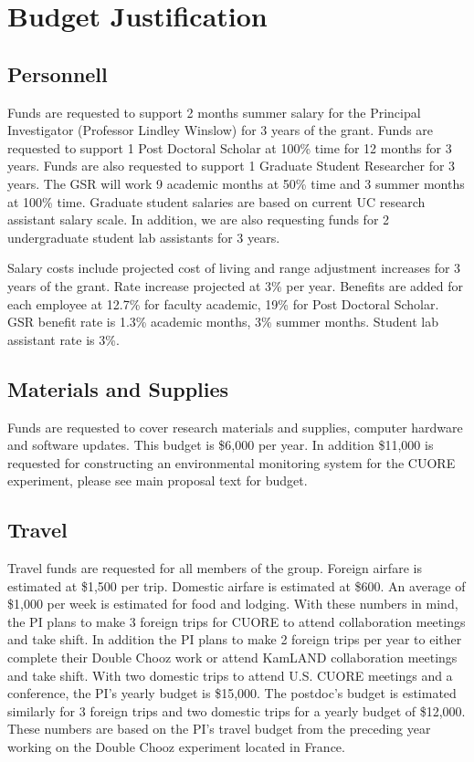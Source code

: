 \section{Budget Justification}

\subsection{Personnell}
Funds are requested to support 2 months summer salary for the Principal Investigator (Professor Lindley Winslow) for 3 years of the grant.  Funds are requested to support 1 Post Doctoral Scholar at 100\% time for 12 months for 3 years.  Funds are also requested to support 1 Graduate Student Researcher for 3 years. The GSR will work 9 academic months at 50\% time and 3 summer months at 100\% time.  Graduate student salaries are based on current UC research assistant salary scale. In addition, we are also requesting funds for 2 undergraduate student lab assistants for 3 years.

Salary costs include projected cost of living and range adjustment increases for 3 years of the grant.  Rate increase projected at 3\% per year. Benefits are added for each employee at 12.7\% for faculty academic, 19\% for Post Doctoral Scholar.  GSR benefit rate is 1.3\% academic months, 3\% summer months.  Student lab assistant
rate is 3\%.


\subsection{Materials and Supplies}
Funds are requested to cover research materials and supplies, computer hardware and software updates. This budget is \$6,000 per year. In addition \$11,000 is requested for constructing an environmental monitoring system for the CUORE experiment, please see main proposal text for budget.


\subsection{Travel}
Travel funds are requested for all members of the group. Foreign airfare is estimated at \$1,500 per trip. Domestic airfare is estimated at \$600. An average of \$1,000 per week is estimated for food and lodging. With these numbers in mind, the PI plans to make 3 foreign trips for CUORE to attend collaboration meetings and take shift. In addition the PI plans to make 2 foreign trips per year to either complete their Double Chooz work or attend KamLAND collaboration meetings and take shift. With two domestic trips to attend U.S. CUORE meetings and a conference, the PI's yearly budget is \$15,000.  The postdoc's budget is estimated similarly for 3 foreign trips and two domestic trips for a yearly budget of \$12,000.  These numbers are based on the PI's travel budget from the preceding year working on the Double Chooz experiment located in France.

